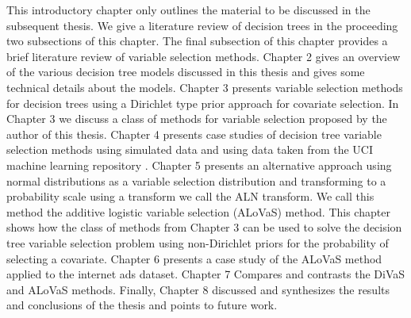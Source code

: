 This introductory chapter only outlines the material to be discussed in the subsequent thesis. We give a literature review of decision trees in the proceeding two subsections of this chapter. The final subsection of this chapter provides a brief literature review of variable selection methods. Chapter 2 gives an overview of the various decision tree models discussed in this thesis and gives some technical details about the models. Chapter 3 presents variable selection methods for decision trees using a Dirichlet type prior approach for covariate selection. In Chapter 3 we discuss a class of methods for variable selection proposed by the author of this thesis. Chapter 4 presents case studies of decision tree variable selection methods using simulated data and using data taken from the UCI machine learning repository \cite{Frank:2010uq}. Chapter 5 presents an alternative approach using normal distributions as a variable selection distribution and transforming to a probability scale using a transform we call the ALN transform. We call this method the additive logistic variable selection (ALoVaS) method. 
This chapter shows how the class of methods from Chapter 3 can be used to solve the decision tree variable selection problem using non-Dirichlet priors for the probability of selecting a covariate. Chapter 6 presents a case study of the ALoVaS method applied to the internet ads dataset. Chapter 7 Compares  and contrasts the DiVaS and ALoVaS methods. Finally, Chapter 8 discussed and synthesizes the results and conclusions of the thesis and points to future work. %



